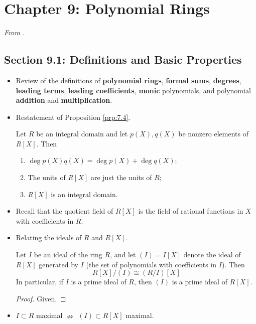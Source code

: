 \documentclass[../notes.tex]{subfiles}
\begin{document}
\section{Chapter 9: Polynomial Rings}
\emph{From \textcite{bib:DummitFoote}.}
\setcounter{bookch}{9}
\subsection*{Section 9.1: Definitions and Basic Properties}
\begin{itemize}
    \item {}Review of the definitions of \textbf{polynomial rings}, \textbf{formal sums}, \textbf{degrees}, \textbf{leading terms}, \textbf{leading coefficients}, \textbf{monic} polynomials, and polynomial \textbf{addition} and \textbf{multiplication}.
    \item Restatement of Proposition \ref{prp:7.4}.
    \begin{proposition}\label{prp:9.1}
        Let $R$ be an integral domain and let $p(X),q(X)$ be nonzero elements of $R[X]$. Then
        \begin{enumerate}
            \item $\deg p(X)q(X)=\deg p(X)+\deg q(X)$;
            \item The units of $R[X]$ are just the units of $R$;
            \item $R[X]$ is an integral domain.
        \end{enumerate}
    \end{proposition}
    \item Recall that the quotient field of $R[X]$ is the field of rational functions in $X$ with coefficients in $R$.
    \item Relating the ideals of $R$ and $R[X]$.
    \begin{proposition}\label{prp:9.2}
        Let $I$ be an ideal of the ring $R$, and let $(I)=I[X]$ denote the ideal of $R[X]$ generated by $I$ (the set of polynomials with coefficients in $I$). Then
        \begin{equation*}
            R[X]/(I) \cong (R/I)[X]
        \end{equation*}
        In particular, if $I$ is a prime ideal of $R$, then $(I)$ is a prime ideal of $R[X]$.
        \begin{proof}
            Given.
        \end{proof}
    \end{proposition}
    \item $I\subset R$ maximal $\nRightarrow$ $(I)\subset R[X]$ maximal.

\end{itemize}
\end{document}

